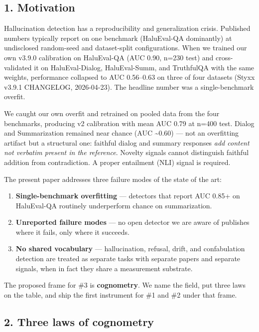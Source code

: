 \documentclass[
  11pt]{article}
\providecommand{\tightlist}{%
  \setlength{\itemsep}{0pt}\setlength{\parskip}{0pt}}
\begin{document}
\subsection{1. Motivation}\label{motivation}

Hallucination detection has a reproducibility and generalization crisis.
Published numbers typically report on one benchmark (HaluEval-QA
dominantly) at undisclosed random-seed and dataset-split configurations.
When we trained our own v3.9.0 calibration on HaluEval-QA (AUC 0.90,
n=230 test) and cross-validated it on HaluEval-Dialog, HaluEval-Summ,
and TruthfulQA with the same weights, performance collapsed to AUC
0.56--0.63 on three of four datasets (Styxx v3.9.1 CHANGELOG,
2026-04-23). The headline number was a single-benchmark overfit.

We caught our own overfit and retrained on pooled data from the four
benchmarks, producing v2 calibration with mean AUC 0.79 at n=400 test.
Dialog and Summarization remained near chance (AUC \textasciitilde0.60)
--- not an overfitting artifact but a structural one: faithful dialog
and summary responses \emph{add content not verbatim present in the
reference}. Novelty signals cannot distinguish faithful addition from
contradiction. A proper entailment (NLI) signal is required.

The present paper addresses three failure modes of the state of the art:

\begin{enumerate}
\def\labelenumi{\arabic{enumi}.}
\tightlist
\item
  \textbf{Single-benchmark overfitting} --- detectors that report AUC
  0.85+ on HaluEval-QA routinely underperform chance on summarization.
\item
  \textbf{Unreported failure modes} --- no open detector we are aware of
  publishes where it fails, only where it succeeds.
\item
  \textbf{No shared vocabulary} --- hallucination, refusal, drift, and
  confabulation detection are treated as separate tasks with separate
  papers and separate signals, when in fact they share a measurement
  substrate.
\end{enumerate}

The proposed frame for \#3 is \textbf{cognometry}. We name the field,
put three laws on the table, and ship the first instrument for \#1 and
\#2 under that frame.

\subsection{2. Three laws of cognometry}\label{three-laws-of-cognometry}
\end{document}
